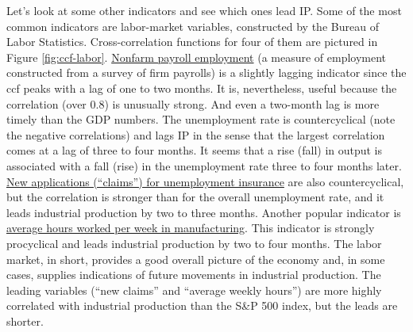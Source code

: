 Let's look at some other indicators and see which ones lead IP.
Some of the most common indicators are labor-market variables,
constructed by the Bureau of Labor Statistics.
Cross-correlation functions for four of them are pictured in
Figure \ref{fig:ccf-labor}.
\href{http://research.stlouisfed.org/fred2/series/PAYEMS}{Nonfarm payroll employment} (a measure of employment constructed
from a survey of firm payrolls) is a slightly
lagging indicator since the ccf peaks with a lag of one to two months.
It is, nevertheless, useful because the correlation (over 0.8) is
unusually strong.
And even a two-month lag is more timely than the GDP numbers.
The unemployment rate is countercyclical (note the negative correlations)
and lags IP in the sense that the largest correlation comes at a
lag of three to four months.
It seems that a rise (fall) in output is associated with a fall (rise)
in the unemployment rate three to four months later.
\href{http://research.stlouisfed.org/fred2/series/IC4WSA}{New applications (``claims'') for unemployment insurance} are also
countercyclical, but the correlation is stronger than for
the overall unemployment rate, and it leads
industrial production by two to three months.
Another popular indicator
is \href{http://research.stlouisfed.org/fred2/series/AWHMAN}{average hours worked per week in manufacturing}.
This indicator is strongly procyclical and leads industrial production
by two to four months.
The labor market, in short, provides a good overall picture of the
economy and, in some cases, supplies indications of future movements
in industrial production.
The leading variables (``new claims'' and ``average weekly hours'')
are more highly correlated with industrial production
than the S\&P 500 index, but the leads are shorter.

